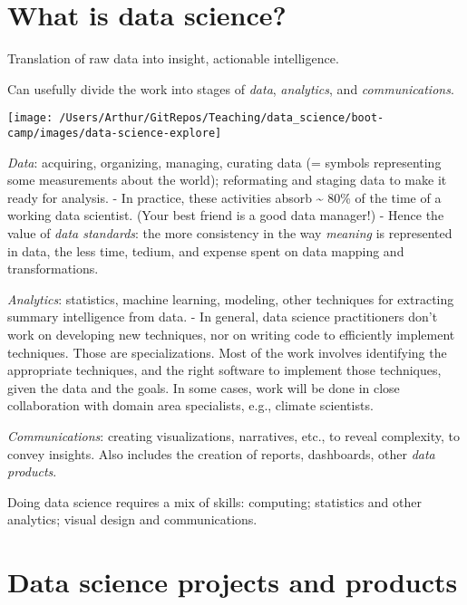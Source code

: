 \documentclass[
]{book}
\begin{document}
\hypertarget{what-is-data-science}{%
\section{What is data science?}\label{what-is-data-science}}

Translation of raw data into insight, actionable intelligence.

Can usefully divide the work into stages of \emph{data}, \emph{analytics}, and \emph{communications}.

\begin{center}\texttt{[image: /Users/Arthur/GitRepos/Teaching/data\_science/boot-camp/images/data-science-explore]} \end{center}

\emph{Data}: acquiring, organizing, managing, curating data (= symbols representing some measurements about the world); reformating and staging data to make it ready for analysis.
- In practice, these activities absorb \textasciitilde{} 80\% of the time of a working data scientist. (Your best friend is a good data manager!)
- Hence the value of \emph{data standards}: the more consistency in the way \emph{meaning} is represented in data, the less time, tedium, and expense spent on data mapping and transformations.

\emph{Analytics}: statistics, machine learning, modeling, other techniques for extracting summary intelligence from data.
- In general, data science practitioners don't work on developing new techniques, nor on writing code to efficiently implement techniques. Those are specializations. Most of the work involves identifying the appropriate techniques, and the right software to implement those techniques, given the data and the goals. In some cases, work will be done in close collaboration with domain area specialists, e.g., climate scientists.

\emph{Communications}: creating visualizations, narratives, etc., to reveal complexity, to convey insights. Also includes the creation of reports, dashboards, other \emph{data products}.

Doing data science requires a mix of skills: computing; statistics and other analytics; visual design and communications.

\hypertarget{data-science-projects-and-products}{%
\section{Data science projects and products}\label{data-science-projects-and-products}}
\end{document}
